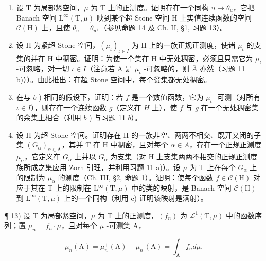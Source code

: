 \begin{enumerate}
\def\labelenumi{\alph{enumi})}
\item
  设 T 为局部紧空间，\(\mu\) 为 T 上的正测度。证明存在一个同构 \(u \mapsto \theta_{u}\)，它把 Banach 空间 \(\mathrm{L}^{\infty}(\mathrm{T}, \mu)\) 映到某个超 Stone 空间 H 上实值连续函数的空间 \(\mathcal{C}(\mathrm{H})\) 上，且使 \(\theta_{u}^{+} = \theta_{u^{+}}\)（参见命题 14 及 Ch. II, §1, 习题 13）。
\item
  设 H 为紧超 Stone 空间，\((\mu_{\iota})_{\iota\in I}\) 为 H 上的一族正规正测度，使诸 \(\mu_{\iota}\) 的支集的并在 H 中稠密。证明：为使一个集在 H 中无处稠密，必须且只需它为 \(\mu_{\iota}\) -可忽略，对一切 \(\iota\in I\)（注意若 A 是 \(\mu_{\iota}\) -可忽略的，则 \(\overline{A}\) 亦然（习题 11 b)））。由此推出：在超 Stone 空间中，每个贫集都无处稠密。
\item
  在与 \(b\) ) 相同的假设下，证明：若 \(f\) 是一个数值函数，它为 \(\mu_{\iota}\) -可测（对所有 \(\iota \in I\)），则存在一个连续函数 \(g\)（定义在 \(H\) 上），使 \(f\) 与 \(g\) 在一个无处稠密集的余集上相合（利用 \(b\) ) 与习题 11 \(b\)）。
\item
  设 H 为超 Stone 空间。证明存在 H 的一族非空、两两不相交、既开又闭的子集 \((\mathrm{G}_{\alpha})_{\alpha\in\mathrm{A}}\)，其并 T 在 H 中稠密，且对每个 \(\alpha\in A\)，存在一个正规正测度 \(\mu_{\alpha}\)，它定义在 \(G_{\alpha}\) 上并以 \(G_{\alpha}\) 为支集（对 H 上支集两两不相交的正规正测度族所成之集应用 Zorn 引理，并利用习题 11 a)）。设 \(\mu\) 为 T 上在每个 \(G_{\alpha}\) 上的限制为 \(\mu_{\alpha}\) 的测度（Ch. III, §2, 命题 1）。证明：使每个函数 \(f\in\mathcal{C}(\mathrm{H})\) 对应于其在 T 上的限制在 \(\mathrm{L}^{\infty}(\mathrm{T},\mu)\) 中的类的映射，是 Banach 空间 \(\mathcal{C}(\mathrm{H})\) 到 \(\mathrm{L}^{\infty}(\mathrm{T},\mu)\) 上的一个同构（利用 c) 证明该映射是满射）。
\end{enumerate}

¶ 13) 设 T 为局部紧空间，\(\mu\) 为 T 上的正测度，\((f_n)\) 为 \(\mathcal{L}^1(\mathrm{T},\mu)\) 中的函数序列；置 \(\mu_n = f_n \cdot \mu\)，且对每个 \(\mu\) -可测集 A，

\[
\mu_ {n} (\mathrm{A}) = \mu_ {n} ^ {+} (\mathrm{A}) - \mu_ {n} ^ {-} (\mathrm{A}) = \int_ {\mathrm{A}} f _ {n} d \mu .
\]

